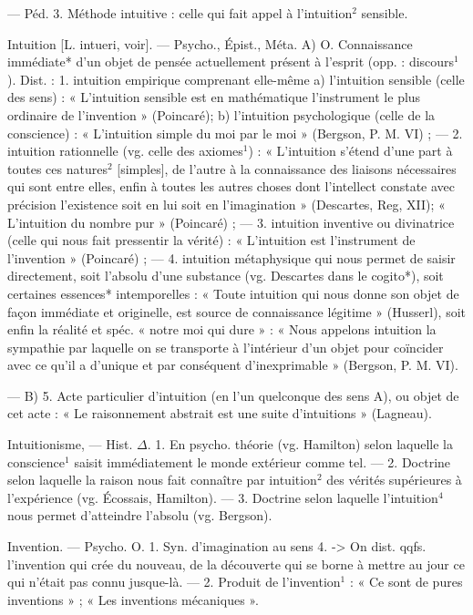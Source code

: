 — Péd. 3. Méthode intuitive :
celle qui fait appel à l'intuition$^2$
sensible.

Intuition [L. intueri, voir]. — Psycho.,
Épist., Méta. A) O. Connaissance
immédiate* d’un objet de pensée
actuellement présent à l'esprit (opp. :
discours$^1$). Dist. : 1. intuition empirique comprenant elle-même
a) l'intuition sensible (celle des sens) :
« L'intuition sensible est en mathématique
l'instrument le plus ordinaire de
l'invention » (Poincaré); b) l'intuition psychologique (celle de la conscience) : « L’intuition simple du
moi par le moi » (Bergson, P. M.
VI) ; — 2. intuition rationnelle (vg.
celle des axiomes$^1$) : « L’intuition
s'étend d'une part à toutes ces
natures$^2$ [simples], de l’autre à la
connaissance des liaisons nécessaires
qui sont entre elles, enfin à toutes
les autres choses dont l’intellect
constate avec précision l'existence
soit en lui soit en l'imagination »
(Descartes, Reg, XII); « L’intuition du nombre pur » (Poincaré) ; —
3. intuition inventive ou divinatrice
(celle qui nous fait pressentir la
vérité) : « L’intuition est l’instrument de l'invention » (Poincaré) ; —
4. intuition métaphysique qui nous
permet de saisir directement, soit
l'absolu d’une substance (vg. Descartes dans le cogito*), soit certaines
essences* intemporelles : « Toute
intuition qui nous donne son objet
de façon immédiate et originelle,
est source de connaissance légitime »
(Husserl), soit enfin la réalité et
spéc. « notre moi qui dure » : « Nous
appelons intuition la sympathie par
laquelle on se transporte à l’intérieur
d’un objet pour coïncider avec
ce qu'il a d’unique et par conséquent
d’inexprimable » (Bergson, P. M.
VI).

— B) 5. Acte particulier d’intuition
(en l’un quelconque des
sens A), ou objet de cet acte : « Le
raisonnement abstrait est une suite
d’intuitions » (Lagneau).

Intuitionisme, — Hist. $\Delta$. 1. En psycho.
théorie (vg. Hamilton) selon laquelle
la conscience$^1$ saisit immédiatement
le monde extérieur comme tel. —
2. Doctrine selon laquelle la raison
nous fait connaître par intuition$^2$
des vérités supérieures à l’expérience
(vg. Écossais, Hamilton). —
3. Doctrine selon laquelle l'intuition$^4$
nous permet d'atteindre l'absolu
(vg. Bergson).

Invention. — Psycho. O. 1. Syn.
d'imagination au sens 4. -> On
dist. qqfs. l'invention qui crée du
nouveau, de la découverte qui se
borne à mettre au jour ce qui n’était
pas connu jusque-là. — 2. Produit
de l'invention$^1$ : « Ce sont de
pures inventions » ; « Les inventions
mécaniques ».

